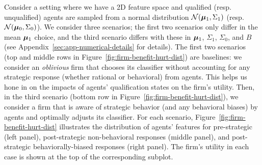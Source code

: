 \begin{example}\label{ex:firm-benefit-hurt}
Consider a setting where we have a 2D feature space and qualified (resp. unqualified) agents are sampled from a normal distribution $\mathcal{N}({\bm{\mu}}_{1}, \Sigma_1)$ (resp. $\mathcal{N}({\bm{\mu}}_0, \Sigma_0)$). We consider three scenarios; the first two scenarios only differ in the mean ${\bm{\mu}}_{1}$ choice, and the third scenario differs with these in ${\bm{\mu}}_{1}$, $\Sigma_1$, $\Sigma_0$, and $B$ (see Appendix~\ref{sec:app-numerical-details} for details). The first two scenarios (top and middle rows in Figure~\ref{fig:firm-benefit-hurt-dist}) are baselines: we consider an \emph{oblivious} firm that chooses its classifier without accounting for any strategic response (whether rational or behavioral) from agents. This helps us hone in on the impacts of agents' qualification states on the firm's utility. Then, in the third scenario (bottom row in Figure~\ref{fig:firm-benefit-hurt-dist}), we consider a firm that is aware of strategic behavior (and any behavioral biases) by agents and optimally adjusts its classifier. For each scenario, Figure~\ref{fig:firm-benefit-hurt-dist} illustrates the distribution of agents' features for pre-strategic (left panel), post-strategic non-behavioral responses (middle panel), and post-strategic behaviorally-biased responses (right panel). The firm's utility in each case is shown at the top of the corresponding subplot.


\end{example}
